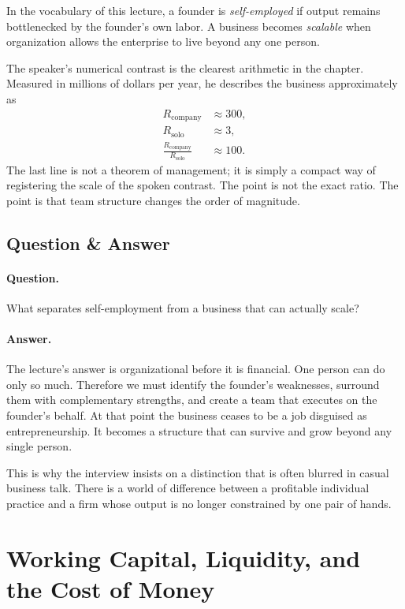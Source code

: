 \begin{definition}
In the vocabulary of this lecture, a founder is \emph{self-employed} if output remains bottlenecked by the founder's own labor. A business becomes \emph{scalable} when organization allows the enterprise to live beyond any one person.
\end{definition}

The speaker's numerical contrast is the clearest arithmetic in the chapter. Measured in millions of dollars per year, he describes the business approximately as
\begin{align}
R_{\text{company}} &\approx 300,\\
R_{\text{solo}} &\approx 3,\\
\frac{R_{\text{company}}}{R_{\text{solo}}} &\approx 100.
\end{align}
The last line is not a theorem of management; it is simply a compact way of registering the scale of the spoken contrast. The point is not the exact ratio. The point is that team structure changes the order of magnitude.

\subsection{Question \& Answer}

\paragraph{Question.} What separates self-employment from a business that can actually scale?

\paragraph{Answer.} The lecture's answer is organizational before it is financial. One person can do only so much. Therefore we must identify the founder's weaknesses, surround them with complementary strengths, and create a team that executes on the founder's behalf. At that point the business ceases to be a job disguised as entrepreneurship. It becomes a structure that can survive and grow beyond any single person.

This is why the interview insists on a distinction that is often blurred in casual business talk. There is a world of difference between a profitable individual practice and a firm whose output is no longer constrained by one pair of hands.

\section{Working Capital, Liquidity, and the Cost of Money}


